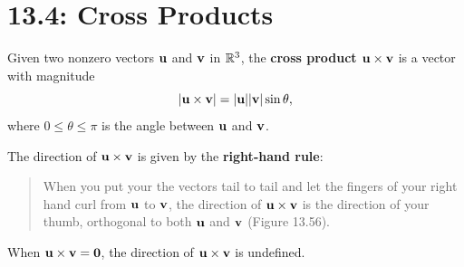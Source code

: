 \documentclass[mathNotesPreamble]{subfiles}
\begin{document}
\section{13.4: Cross Products}
  \begin{defn*}
    Given two nonzero vectors ${\mathbf{u}}$ and ${\mathbf{v}}$ in $\mathbb{R}^3$, the \textbf{cross product ${\mathbf{u}}\times{\mathbf{v}}$} is a vector with magnitude
      \[{\left\vert{\mathbf{u}}\times {\mathbf{v}}\right\vert}={\left\vert{\mathbf{u}}\right\vert}{\left\vert{\mathbf{v}}\right\vert}\sin\theta,\]
    where $0\leq \theta\leq \pi$ is the angle between ${\mathbf{u}}$ and ${\mathbf{v}}$. 

    The direction of ${\mathbf{u}}\times{\mathbf{v}}$ is given by the \textbf{right-hand rule}: 
    \begin{quote}
      When you put your the vectors tail to tail and let the fingers of your right hand curl from ${\mathbf{u}}$ to ${\mathbf{v}}$, the direction of ${\mathbf{u}} \times{\mathbf{v}}$ is the direction of your thumb, orthogonal to both ${\mathbf{u}}$ and ${\mathbf{v}}$ (Figure 13.56).
    \end{quote}
    
    When ${\mathbf{u}}\times {\mathbf{v}}=\mathbf{0}$, the direction of ${\mathbf{u}}\times{\mathbf{v}}$ is undefined.
  \end{defn*}
\end{document}
